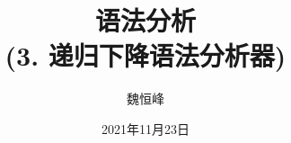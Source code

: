 \documentclass[]{beamer}
\title[语法分析]{语法分析 \\ (3. 递归下降语法分析器)}
\author[魏恒峰]{\large 魏恒峰}
\institute{hfwei@nju.edu.cn}
\date{2021年11月23日}
\begin{document}
\maketitle


% 

\thankyou{}

\end{document}
